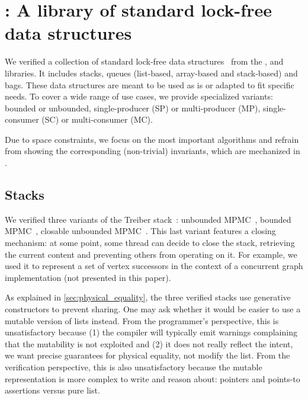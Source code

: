 \section{\Saturn: A library of standard lock-free data structures}
\label{sec:saturn}

We verified a collection of standard lock-free data structures~ from the \Saturn, \Eio and \Picos~\citep{picos} libraries.
It includes stacks, queues (list-based, array-based and stack-based) and bags.
These data structures are meant to be used as is or adapted to fit specific needs.
To cover a wide range of use cases, we provide specialized variants: bounded or unbounded, single-producer (SP) or multi-producer (MP), single-consumer (SC) or multi-consumer (MC).

Due to space constraints, we focus on the most important algorithms and refrain from showing the corresponding (non-trivial) \Iris invariants, which are mechanized in \Rocq.

\subsection{Stacks}

We verified three variants of the Treiber stack~\citep{thomas1986systems}: unbounded MPMC~, bounded MPMC~, closable unbounded MPMC~.
This last variant features a closing mechanism: at some point, some thread can decide to close the stack, retrieving the current content and preventing others from operating on it.
For example, we used it to represent a set of vertex successors in the context of a concurrent graph implementation (not presented in this paper).

As explained in \cref{sec:physical_equality}, the three verified stacks use generative constructors to prevent sharing.
One may ask whether it would be easier to use a mutable version of lists instead.
From the programmer's perspective, this is unsatisfactory because (1) the compiler will typically emit warnings complaining that the mutability is not exploited and (2) it does not really reflect the intent, \ie we want precise guarantees for physical equality, not modify the list.
From the verification perspective, this is also unsatisfactory because the mutable representation is more complex to write and reason about: pointers and points-to assertions versus pure \Rocq list.

